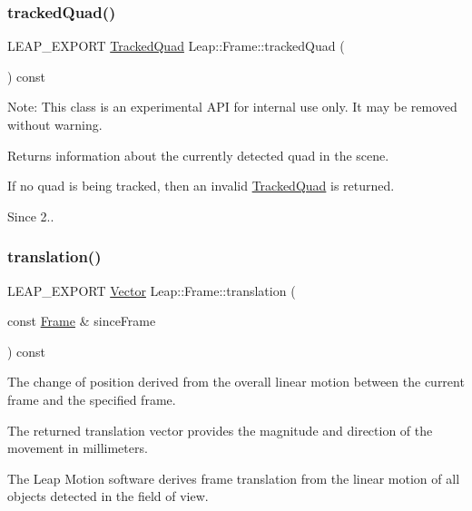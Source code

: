 \subsubsection{\texorpdfstring{tracked\+Quad()}{trackedQuad()}}
{\footnotesize\ttfamily L\+E\+A\+P\+\_\+\+E\+X\+P\+O\+RT \hyperlink{class_leap_1_1_tracked_quad}{Tracked\+Quad} Leap\+::\+Frame\+::tracked\+Quad (\begin{DoxyParamCaption}{ }\end{DoxyParamCaption}) const}

Note\+: This class is an experimental A\+PI for internal use only. It may be removed without warning.

Returns information about the currently detected quad in the scene.


\begin{DoxyCodeInclude}
\end{DoxyCodeInclude}
 If no quad is being tracked, then an invalid \hyperlink{class_leap_1_1_tracked_quad}{Tracked\+Quad} is returned. \begin{DoxySince}{Since}
2.. 
\end{DoxySince}
\mbox{\label{class_leap_1_1_frame_ac1bd55621bc84dda1903801280dd9062}} 
\subsubsection{\texorpdfstring{translation()}{translation()}}
{\footnotesize\ttfamily L\+E\+A\+P\+\_\+\+E\+X\+P\+O\+RT \hyperlink{struct_leap_1_1_vector}{Vector} Leap\+::\+Frame\+::translation (\begin{DoxyParamCaption}\item[{const \hyperlink{class_leap_1_1_frame}{Frame} \&}]{since\+Frame }\end{DoxyParamCaption}) const}

The change of position derived from the overall linear motion between the current frame and the specified frame.

The returned translation vector provides the magnitude and direction of the movement in millimeters.


\begin{DoxyCodeInclude}
\end{DoxyCodeInclude}


The Leap Motion software derives frame translation from the linear motion of all objects detected in the field of view.

